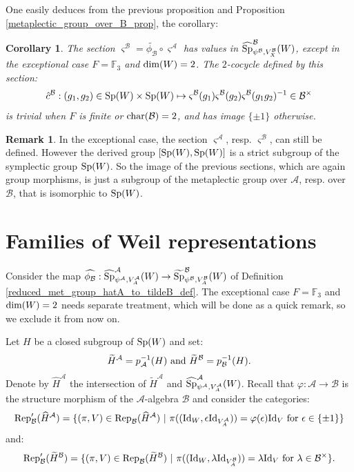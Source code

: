 \documentclass[11pt]{article}
\theoremstyle{plain}
\newtheorem{cor}[theo]{Corollary}
\theoremstyle{definition}
\newtheorem{rem}[theo]{Remark}
\theoremstyle{plain}
\theoremstyle{definition}
\theoremstyle{plain}
\begin{document}
One easily deduces from the previous proposition and Proposition \ref{metaplectic_group_over_B_prop}, the corollary:

\begin{cor} The section $\varsigma^\mathcal{B}= \widetilde{\phi_\mathcal{B}} \circ \varsigma^\mathcal{A}$ has values in $\widehat{\textup{Sp}}_{\psi^\mathcal{B},V_X^\mathcal{B}}^\mathcal{B}(W)$, except in the exceptional case $F= \mathbb{F}_3$ and $\textup{dim}(W) = 2$. The $2$-cocycle defined by this section:
$$\hat{c}^\mathcal{B} : (g_1,g_2) \in \textup{Sp}(W) \times \textup{Sp}(W) \mapsto \varsigma^\mathcal{B}(g_1) \varsigma^\mathcal{B}(g_2) \varsigma^\mathcal{B}(g_1g_2)^{-1} \in \mathcal{B}^\times$$
is trivial when $F$ is finite or $\textup{char}(\mathcal{B})=2$, and has image $\{ \pm 1 \}$ otherwise. \end{cor}

\begin{rem} \label{exceptional_case_sigmaA_sigmaB_rem} In the exceptional case, the section $\varsigma^\mathcal{A}$, resp. $\varsigma^\mathcal{B}$, can still be defined. However the derived group $[\textup{Sp}(W),\textup{Sp}(W)]$ is a strict subgroup of the symplectic group $\textup{Sp}(W)$. So the image of the previous sections, which are again group morphisms, is just a subgroup of the metaplectic group over $\mathcal{A}$, resp. over $\mathcal{B}$, that is isomorphic to $\textup{Sp}(W)$. \end{rem}

\section{Families of Weil representations}

Consider the map $\widehat{\phi_\mathcal{B}} : \widehat{\textup{Sp}}_{\psi^\mathcal{A},V_A^\mathcal{A}}^\mathcal{A}(W) \to \widetilde{\textup{Sp}}_{\psi^\mathcal{B},V_A^\mathcal{B}}^\mathcal{B}(W)$ of Definition \ref{reduced_met_group_hatA_to_tildeB_def}. The exceptional case $F=\mathbb{F}_3$ and $\textup{dim}(W)=2$ needs separate treatment, which will be done as a quick remark, so we exclude it from now on.

Let $H$ be a closed subgroup of $\textup{Sp}(W)$ and set:
$$\widetilde{H}^\mathcal{A} = p_\mathcal{A}^{-1}(H) \textup{ and } \widetilde{H}^\mathcal{B} = p_\mathcal{B}^{-1}(H).$$
Denote by $\widehat{H}^\mathcal{A}$ the intersection of $\widetilde{H}^\mathcal{A}$ and $\widehat{\textup{Sp}}_{\psi^\mathcal{A},V_A^\mathcal{A}}^\mathcal{A}(W)$. Recall that $\varphi : \mathcal{A} \to \mathcal{B}$ is the structure morphism of the $\mathcal{A}$-algebra $\mathcal{B}$ and consider the categories:
$$\textup{Rep}_\mathcal{B}'(\widehat{H}^\mathcal{A}) = \{ (\pi,V) \in \textup{Rep}_\mathcal{B}(\widehat{H}^\mathcal{A}) \ | \ \pi((\textup{Id}_W,\epsilon \textup{Id}_{V_A^\mathcal{A}}))=\varphi(\epsilon) \textup{Id}_V \textup{ for } \epsilon \in \{ \pm 1 \} \}$$
and:
$$\textup{Rep}_\mathcal{B}'(\widetilde{H}^\mathcal{B}) = \{ (\pi,V) \in \textup{Rep}_\mathcal{B}(\widetilde{H}^\mathcal{B}) \ | \ \pi((\textup{Id}_W,\lambda \textup{Id}_{V_A^\mathcal{B}}))=\lambda \textup{Id}_V \textup{ for } \lambda \in \mathcal{B}^\times \}.$$
\end{document}
